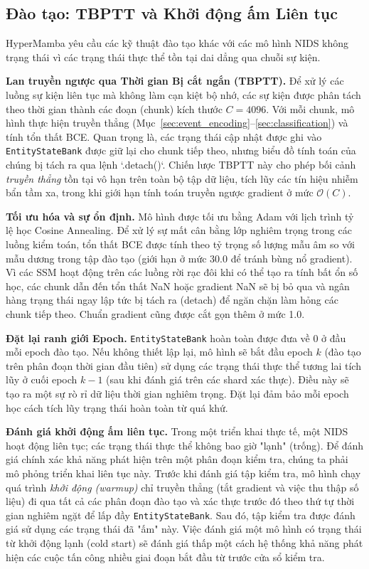 \documentclass[letterpaper,twocolumn,10pt]{article}
\begin{document}
\subsection{Đào tạo: TBPTT và Khởi động ấm Liên tục}
\label{sec:training}

HyperMamba yêu cầu các kỹ thuật đào tạo khác với các mô hình NIDS không trạng thái vì các trạng thái thực thể tồn tại dai dẳng qua chuỗi sự kiện.

\textbf{Lan truyền ngược qua Thời gian Bị cắt ngắn (TBPTT).} Để xử lý các luồng sự kiện liên tục mà không làm cạn kiệt bộ nhớ, các sự kiện được phân tách theo thời gian thành các đoạn (chunk) kích thước $C = 4096$. Với mỗi chunk, mô hình thực hiện truyền thẳng (Mục~\ref{sec:event_encoding}--\ref{sec:classification}) và tính tổn thất BCE. Quan trọng là, các trạng thái cập nhật được ghi vào \texttt{EntityStateBank} được giữ lại cho chunk tiếp theo, nhưng biểu đồ tính toán của chúng bị tách ra qua lệnh `.detach()`. Chiến lược TBPTT này cho phép bối cảnh \emph{truyền thẳng} tồn tại vô hạn trên toàn bộ tập dữ liệu, tích lũy các tín hiệu nhiễm bẩn tầm xa, trong khi giới hạn tính toán truyền ngược gradient ở mức $\mathcal{O}(C)$.

\textbf{Tối ưu hóa và sự ổn định.} Mô hình được tối ưu bằng Adam với lịch trình tỷ lệ học Cosine Annealing. Để xử lý sự mất cân bằng lớp nghiêm trọng trong các luồng kiểm toán, tổn thất BCE được tính theo tỷ trọng số lượng mẫu âm so với mẫu dương trong tập đào tạo (giới hạn ở mức $30.0$ để tránh bùng nổ gradient). Vì các SSM hoạt động trên các luồng rời rạc đôi khi có thể tạo ra tính bất ổn số học, các chunk dẫn đến tổn thất NaN hoặc gradient NaN sẽ bị bỏ qua và ngân hàng trạng thái ngay lập tức bị tách ra (detach) để ngăn chặn làm hỏng các chunk tiếp theo. Chuẩn gradient cũng được cắt gọn thêm ở mức 1.0.

\textbf{Đặt lại ranh giới Epoch.} \texttt{EntityStateBank} hoàn toàn được đưa về 0 ở đầu mỗi epoch đào tạo. Nếu không thiết lập lại, mô hình sẽ bắt đầu epoch $k$ (đào tạo trên phân đoạn thời gian đầu tiên) sử dụng các trạng thái thực thể tương lai tích lũy ở cuối epoch $k-1$ (sau khi đánh giá trên các shard xác thực). Điều này sẽ tạo ra một sự rò rỉ dữ liệu thời gian nghiêm trọng. Đặt lại đảm bảo mỗi epoch học cách tích lũy trạng thái hoàn toàn từ quá khứ.

\textbf{Đánh giá khởi động ấm liên tục.} Trong một triển khai thực tế, một NIDS hoạt động liên tục; các trạng thái thực thể không bao giờ "lạnh" (trống). Để đánh giá chính xác khả năng phát hiện trên một phân đoạn kiểm tra, chúng ta phải mô phỏng triển khai liên tục này. Trước khi đánh giá tập kiểm tra, mô hình chạy quá trình \emph{khởi động (warmup)} chỉ truyền thẳng (tắt gradient và việc thu thập số liệu) đi qua tất cả các phân đoạn đào tạo và xác thực trước đó theo thứ tự thời gian nghiêm ngặt để lấp đầy \texttt{EntityStateBank}. Sau đó, tập kiểm tra được đánh giá sử dụng các trạng thái đã "ấm" này. Việc đánh giá một mô hình có trạng thái từ khởi động lạnh (cold start) sẽ đánh giá thấp một cách hệ thống khả năng phát hiện các cuộc tấn công nhiều giai đoạn bắt đầu từ trước cửa sổ kiểm tra.
\end{document}
